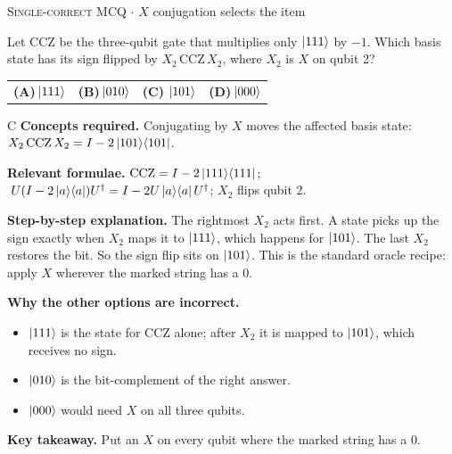 \documentclass[11pt,a4paper]{article}
\newcommand{\optlabel}[1]{\textbf{(#1)}}
\newcommand{\correctlabel}[1]{\textcolor{okgreen}{\textbf{(#1)}\,\ding{51}}}
\newenvironment{qitem}[1]{\begin{list}{}{\setlength{\leftmargin}{3.3em}\setlength{\labelwidth}{3.1em}%
  \setlength{\labelsep}{0.2em}\setlength{\topsep}{3pt}\setlength{\parsep}{3pt}}\item[\textbf{Q.#1}\hfill]}{\end{list}}
\newcommand{\qsep}{\par\vspace{2pt}{\color{black!15}\hrule}\vspace{4pt}}
\newcommand{\qmeta}[2]{{\footnotesize\color{black!60}\textsc{#1} \;$\cdot$\; #2}\par}
\begin{document}
\begin{qitem}{26}
\qmeta{Single-correct MCQ}{$X$ conjugation selects the item}
Let CCZ be the three-qubit gate that multiplies only $\ket{111}$ by $-1$. Which basis state has its sign flipped by $X_2\,\mathrm{CCZ}\,X_2$, where $X_2$ is $X$ on qubit 2?
\par\smallskip\noindent\begin{tabularx}{\linewidth}{@{}*{4}{L}@{}}
\optlabel{A}\,$\ket{111}$ & \optlabel{B}\,$\ket{010}$ & \correctlabel{C}\,$\ket{101}$ & \optlabel{D}\,$\ket{000}$
\end{tabularx}
\end{qitem}
\begin{solbox}{C}
\textbf{\color{brand}Concepts required.} Conjugating by $X$ moves the affected basis state: $X_2\,\mathrm{CCZ}\,X_2 = I - 2\ket{101}\!\bra{101}$.

\textbf{\color{brand}Relevant formulae.} $\mathrm{CCZ} = I - 2\ket{111}\!\bra{111}$; $\;U(I - 2\ket{a}\!\bra{a})U^\dagger = I - 2U\ket{a}\!\bra{a}U^\dagger$; $X_2$ flips qubit 2.

\textbf{\color{brand}Step-by-step explanation.} The rightmost $X_2$ acts first. A state picks up the sign exactly when $X_2$ maps it to $\ket{111}$, which happens for $\ket{101}$. The last $X_2$ restores the
bit. So the sign flip sits on $\ket{101}$. This is the standard oracle recipe: apply $X$ wherever the marked string has a $0$.

\textbf{\color{brand}Why the other options are incorrect.}
\begin{itemize}[leftmargin=2.4em, itemsep=1pt, topsep=2pt]
\item[\textbf{(A)}] $\ket{111}$ is the state for CCZ alone; after $X_2$ it is mapped to $\ket{101}$, which receives no sign.
\item[\textbf{(B)}] $\ket{010}$ is the bit-complement of the right answer.
\item[\textbf{(D)}] $\ket{000}$ would need $X$ on all three qubits.
\end{itemize}
\textbf{\color{brand}Key takeaway.} Put an $X$ on every qubit where the marked string has a $0$.
\end{solbox}
\qsep
\end{document}
